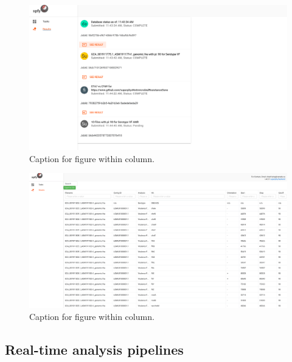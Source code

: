 \documentclass[a4,center,fleqn]{NAR}
\begin{document}
\begin{figure}[t]
\begin{center}
\includegraphics{images/results.png}
\end{center}
\caption{Caption for figure within column.}
\label{fig-results}
\end{figure}

\begin{figure}[t]
\begin{center}
\includegraphics{images/tables.png}
\end{center}
\caption{Caption for figure within column.}
\label{fig-tables}
\end{figure}

\subsection{Real-time analysis pipelines}

\end{document}
